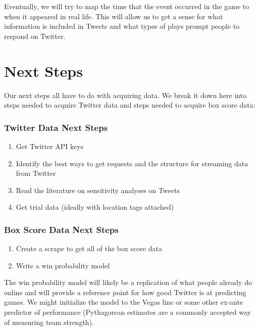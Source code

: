 \documentclass[12pt]{article}
\begin{document}
\noindent
Eventually, we will try to map the time that the event occurred in the game to when it appeared in real life. This will allow us to get a sense for what information is included in Tweets and what types of plays prompt people to respond on Twitter.

\section{Next Steps}

Our next steps all have to do with acquiring data. We break it down here into steps needed to acquire Twitter data and steps needed to acquire box score data:

\subsubsection*{Twitter Data Next Steps}
\begin{enumerate}
	\item Get Twitter API keys
	\item Identify the best ways to get requests and the structure for streaming data from Twitter
	\item Read the literature on sensitivity analyses on Tweets
	\item Get trial data (ideally with location tags attached)
\end{enumerate}

\subsubsection*{Box Score Data Next Steps}
\begin{enumerate}
	\item Create a scrape to get all of the box score data
	\item Write a win probability model
\end{enumerate}

\noindent
The win probability model will likely be a replication of what people already do online and will provide a reference point for how good Twitter is at predicting games. We might initialize the model to the Vegas line or some other ex-ante predictor of performance (Pythagorean estimates are a commonly accepted way of measuring team strength). 
\end{document}
